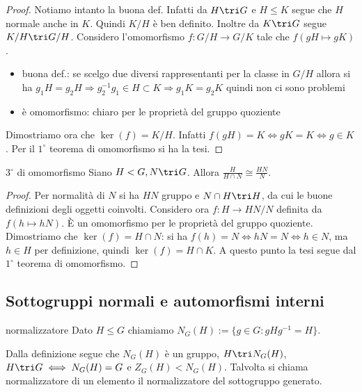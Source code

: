 \begin{proof}
    Notiamo intanto la buona def. Infatti da $H \tri G$ e $H \leq K$ segue che $H$  normale anche in $K$. Quindi $K/H$ è ben definito. Inoltre da $K \tri G$ segue $K/H \tri G/H$.
    Considero l'omomorfismo $f: G/H \rightarrow G/K$ tale che $f(gH \mapsto gK)$.
    \begin{itemize}
    \item buona def.: se scelgo due diversi rappresentanti per la classe in $G/H$  allora si ha $g_1H = g_2H \Rightarrow g_2^{-1}g_1 \in H \subset K \Rightarrow g_1K = g_2K$ quindi non ci sono problemi
    \item è omomorfismo: chiaro per le proprietà del gruppo quoziente
    \end{itemize}
    Dimostriamo ora che $\ker(f) = K/H$. Infatti $f(gH) = K \iff gK = K \iff g \in K$. Per il $1^{\circ}$ teorema di omomorfismo si ha la tesi.
\end{proof}
\begin{theorem}{3$^{\circ}$ di omomorfismo} Siano $H < G, N \tri G$. Allora $\frac{H}{H \cap N} \cong \frac{HN}{N}$.
\end{theorem}
\begin{proof}
    Per normalità di $N$ si ha $HN$ gruppo e $N \cap H \tri H$, da cui le buone definizioni degli oggetti coinvolti. Considero ora $f: H \rightarrow HN/N$ definita da $f(h \mapsto hN)$. È un omomorfismo per le proprietà del gruppo quoziente. 
    Dimostriamo che $\ker(f) = H \cap N$: si ha $f(h) = N \iff hN = N \iff h \in N$, ma $h\in H$ per definizione, quindi $\ker(f) = H \cap K$. A questo punto la tesi segue dal $1^{\circ}$ teorema di omomorfismo.
\end{proof}

\subsection{Sottogruppi normali e automorfismi interni}
\begin{definition}{normalizzatore}
    Dato $H \leq G$ chiamiamo $N_G(H) := \{g \in G : gHg^{-1} = H\}$.
\end{definition}

Dalla definizione segue che $N_G(H)$ è un gruppo, $H \tri N_G(H)$, $H \tri G \iff N_G(H) = G$ e $Z_G(H) < N_G(H)$. Talvolta si chiama normalizzatore di un elemento il normalizzatore del sottogruppo generato.

